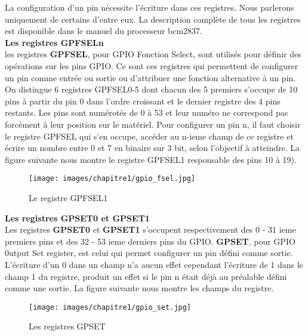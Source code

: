 \documentclass[12pt,a4paper,oneside]{book}
\begin{document}
\begin{itemize}
		La configuration d'un pin nécessite l'écriture dans ces registres. Nous parlerons uniquement de certains d'entre eux. La description complète de tous les registres est disponible dans le manuel du processeur bcm2837.\\
		
		\textbf{Les registres GPFSELn}\\
			les registres \textbf{GPFSEL}, pour GPIO Fonction Select, sont utilisés pour définir des opérations sur les pins GPIO. Ce sont ces registres qui permettent de configurer un pin comme entrée ou sortie ou d'attribuer une fonction alternative à un pin. On distingue 6 registres GPFSEL{0-5} dont chacun des 5 premiers s'occupe de 10 pins à partir du pin 0 dans l'ordre croissant et le dernier registre des 4 pins restants. Les pins sont numérotés de 0 à 53 et leur numéro ne correspond pas forcément à leur position sur le matériel. Pour configurer un pin n, il faut choisir le registre GPFSEL qui s'en occupe, accéder au n-ieme champ de ce registre et écrire un nombre entre 0 et 7 en binaire sur 3 bit, selon l'objectif à atteindre. La figure suivante nous montre le registre GPFSEL1 responsable des pins 10 à 19).\\
			\begin{figure}[H]
					\centering
					\texttt{[image: images/chapitre1/gpio\_fsel.jpg]}
					\caption{Le registre GPFSEL1}
					\label{Types}
			\end{figure}
			
		\textbf{Les registres GPSET0 et GPSET1}\\
			Les registres \textbf{GPSET0} et \textbf{GPSET1} s'occupent respectivement des 0 - 31 ieme premiers pins et des 32 - 53 ieme derniers pins du GPIO. \textbf{GPSET}, pour GPIO 0utput Set register, est celui qui permet configurer un pin défini comme sortie. L'écriture d'un 0 dans un champ n'a aucun effet cependant l'écriture de 1 dans le champ 1 du registre, produit un effet si le pin n était déjà au préalable défini comme une sortie. La figure suivante nous montre les champs du registre.\\
			\begin{figure}[H]
					\centering
					\texttt{[image: images/chapitre1/gpio\_set.jpg]}
					\caption{Les registres GPSET}
					\label{Types}
			\end{figure}
			

\end{itemize}
\end{document}

